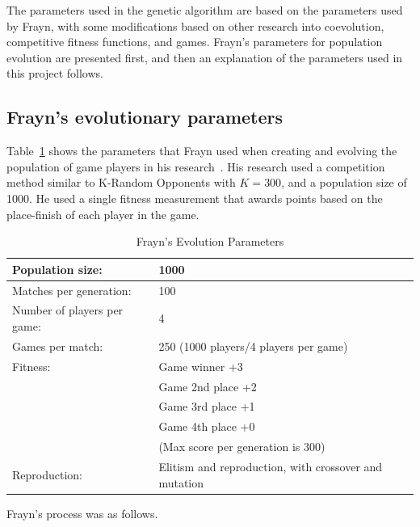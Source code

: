 The parameters used in the genetic algorithm are based on the parameters used by
Frayn, with some modifications based on other research into coevolution,
competitive fitness functions, and games. Frayn's parameters for population evolution
are presented first, and then an explanation of the parameters
used in this project follows.

\subsection{Frayn's evolutionary parameters}

Table~\ref{table-fraynparams} shows the parameters that Frayn used when creating
and evolving the population of game players in his
research~\cite{DBLP:conf/cig/Frayn05}. His research used a competition method
similar to K-Random Opponents with \(K=300\), and a population size of
1000. He used a single fitness measurement that awards points based on the
place-finish of each player in the game.

\begin{table}[ht]
\caption{Frayn's Evolution Parameters}
\begin{center}
\begin{tabular}{ | l | l | }
  \hline                        
  Population size: & 1000 \\ \hline
  Matches per generation: & 100 \\ \hline
  Number of players per game: & 4 \\ \hline
  Games per match: & 250 (1000 players/4 players per game) \\ \hline
  Fitness: & Game winner	+3 \\
  & Game 2nd place	+2 \\
  & Game 3rd place	+1 \\
  & Game 4th place	+0 \\
  & (Max score per generation is 300) \\ \hline
  Reproduction: & Elitism and reproduction, with crossover and mutation \\ \hline  
\end{tabular}
\label{table-fraynparams}
\end{center}
\end{table}

Frayn's process was as follows. 

